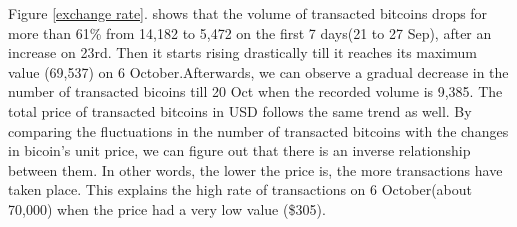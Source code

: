 \documentclass{article}\usepackage[]{graphicx}\usepackage[]{color}
\begin{document}
Figure \ref{exchange rate}. shows that the volume of transacted bitcoins drops for more than 61\% from 14,182 to 5,472 on the first 7 days(21 to 27 Sep), after an increase on 23rd. Then it starts rising drastically till it reaches its maximum value (69,537) on 6 October.Afterwards, we can observe a gradual decrease in the number of transacted bicoins till 20 Oct when the recorded volume is 9,385. The total price of transacted bitcoins in USD follows the same trend as well.
By comparing the fluctuations in the number of transacted bitcoins with the changes in bicoin's unit price, we can figure out that there is an inverse relationship between them. In other words, the lower the price is, the more transactions have taken place. This explains the high rate of transactions on 6 October(about 70,000) when the price had a very low value (\$305).
\end{document}
